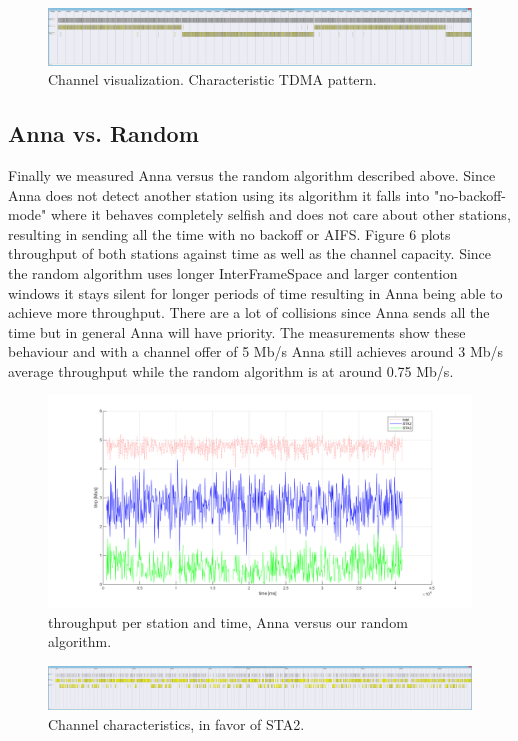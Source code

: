 \documentclass[12pt]{article}
\begin{document}
\begin{figure}[h!]
\centering
\includegraphics[width=\textwidth]{img/Anna_vs_Anna_TDMA.png}
\caption{Channel visualization. Characteristic TDMA pattern. \label{fig:aa}}
\end{figure}

\subsection{Anna vs. Random}
Finally we measured Anna versus the random algorithm described above.
Since Anna does not detect another station using its algorithm it falls into "no-backoff-mode" where it behaves completely selfish and does not care about other stations, resulting in sending all the time with no backoff or AIFS.
Figure 6 plots throughput of both stations against time as well as the channel capacity.
Since the random algorithm uses longer InterFrameSpace and larger contention windows it stays silent for longer periods of time resulting in Anna being able to achieve more throughput.
There are a lot of collisions since Anna sends all the time but in general Anna will have priority.
The measurements show these behaviour and with a channel offer of 5 Mb/s Anna still achieves around 3 Mb/s average throughput while the random algorithm is at around 0.75 Mb/s.
\begin{figure}[h!]
\centering
\includegraphics[width=\textwidth]{img/annaVSrandom_thrp.png}
\caption{throughput per station and time, Anna versus our random algorithm. \label{fig:aa}}
\end{figure}

\begin{figure}[h!]
\centering
\includegraphics[width=\textwidth]{img/annaVSrandom.png}
\caption{Channel characteristics, in favor of STA2.  \label{fig:aa}}
\end{figure}
\end{document}
